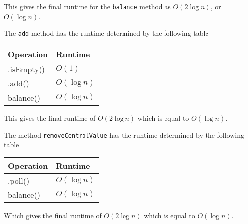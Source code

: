 \documentclass{article}
\begin{document}
\begin{ans}
    This gives the final runtime for the \texttt{balance} method as \( O\left( 2 \log n \right) \), or \( O\left( \log n \right) \).
    \medskip

    The \texttt{add} method has the runtime determined by the following table

    \begin{table}[H]
        \begin{center}
            \begin{tabular}[c]{|l|l|}
                \hline
                 Operation & Runtime  \\
                \hline
                 .isEmpty() & \( O(1) \)  \\
                 .add() & \( O \left( \log n \right)  \)  \\
                balance()& \( O \left( \log n \right) \) \\
                \hline
            \end{tabular}
        \end{center}
    \end{table}

    This gives the final runtime of \( O\left( 2 \log n \right) \) which is equal to \( O\left( \log n \right) \).
    \medskip

    The method \texttt{removeCentralValue} has the runtime determined by the following table

    \begin{table}[H]
        \begin{center}
            \begin{tabular}[c]{|l|l|}
                \hline
                 Operation & Runtime  \\
                \hline
                 .poll() & \( O \left( \log n \right)  \)  \\
                balance()& \( O \left( \log n \right) \) \\
                \hline
            \end{tabular}
        \end{center}
    \end{table}

    Which gives the final runtime of \( O\left( 2 \log n \right) \) which is equal to \( O\left( \log n \right) \).

    \end{ans}
\end{document}
